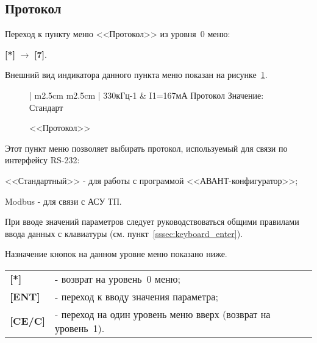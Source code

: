 \subsection{Протокол}	\label{ssec:protocol}

Переход к пункту меню <<Протокол>> из уровня~0 меню: 

\textbf{[*]} $\rightarrow$ \textbf{[7]}.

Внешний вид индикатора данного пункта меню показан на рисунке~\ref{fig:protocol}.
 
 \begin{figure}[H]
 	\centering
 	
	\begin{tabular}{| m{2.5cm}  m{2.5cm} |}
		\firsthline
		330кГц-1	& \raggedleft I1=167мА			\tabularnewline 
		 {Протокол}				\tabularnewline
		 {Значение: Стандарт} 	\tabularnewline 
		 {}						\tabularnewline 
		\lasthline
	\end{tabular} 
	
	\caption{<<Протокол>>}
	\label{fig:protocol}
\end{figure}

Этот пункт меню позволяет выбирать протокол, используемый для связи по интерфейсу RS-232: 
\begin{list}{--}{}
	\item <<Стандартный>> - для работы с программой <<АВАНТ-конфигуратор>>;
	\item Modbus - для связи с АСУ ТП.
\end{list}

При вводе значений параметров следует руководствоваться общими правилами ввода данных с клавиатуры (см. пункт~\ref{sssec:keyboard_enter}).

Назначение кнопок на данном уровне меню показано ниже.
\begin{center}
	\begin{tabular}{p{2cm} p{15cm}}
		\textbf{[*]} 			& - возврат на уровень~0 меню; \tabularnewline
		\textbf{[ENT]} 			& - переход к вводу значения параметра; \tabularnewline
		\textbf{[CE/C]} 		& - переход на один уровень меню вверх (возврат на уровень~1). \tabularnewline				
	\end{tabular}
\end{center}